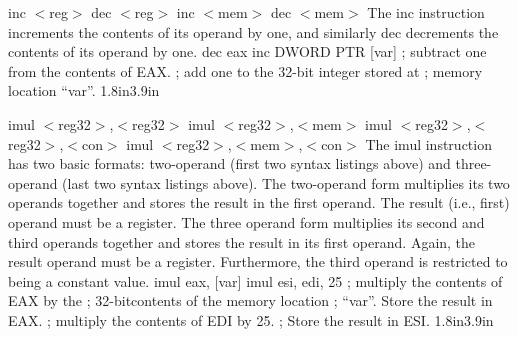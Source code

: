 {inc $<$reg$>$ \hspace{0.5in} dec $<$reg$>$\newline
inc $<$mem$>$ \hspace{0.5in} dec $<$mem$>$}
{The inc instruction increments the contents of its operand by one,
  and similarly dec decrements the contents of its operand by one.}
{dec eax \newline inc DWORD PTR [var]}
{; subtract one from the contents of EAX. \newline
; add one to the 32-bit integer stored at \newline
; memory location ``var''.}
{1.8in}{3.9in}

{imul $<$reg32$>$,$<$reg32$>$\newline
imul $<$reg32$>$,$<$mem$>$\newline
imul $<$reg32$>$,$<$reg32$>$,$<$con$>$\newline
imul $<$reg32$>$,$<$mem$>$,$<$con$>$}
{The imul instruction has two basic formats: two-operand (first two
syntax listings above) and three-operand (last two syntax listings
above).  The two-operand form multiplies its two operands together and
stores the result in the first operand. The result (i.e., first)
operand must be a register.  The three operand form multiplies its
second and third operands together and stores the result in its first
operand. Again, the result operand must be a register.  Furthermore,
the third operand is restricted to being a constant value.}
{imul eax, [var]\newline\newline\newline
imul esi, edi, 25}
{; multiply the contents of EAX by the \newline
; 32-bitcontents of the memory location \newline
; ``var''. Store the result in EAX.\newline
; multiply the contents of EDI by 25. \newline
; Store the result in ESI.}
{1.8in}{3.9in}

